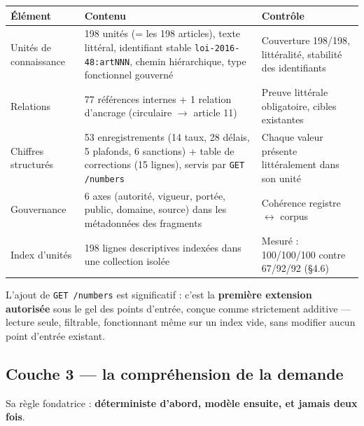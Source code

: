 \documentclass[a4paper,12pt]{report}
\begin{document}
\begin{table}[H]
\centering
\small
\begin{tabular}{p{3.4cm}p{7.4cm}p{3.7cm}}
\toprule
\textbf{Élément} & \textbf{Contenu} & \textbf{Contrôle} \\
\midrule
Unités de connaissance & 198 unités (= les 198 articles), texte littéral, identifiant stable
\texttt{loi-2016-48:artNNN}, chemin hiérarchique, type fonctionnel gouverné & Couverture 198/198,
littéralité, stabilité des identifiants \\
Relations & 77 références internes + 1 relation d'ancrage (circulaire $\rightarrow$ article 11) &
Preuve littérale obligatoire, cibles existantes \\
Chiffres structurés & 53 enregistrements (14 taux, 28 délais, 5 plafonds, 6 sanctions) + table de
corrections (15 lignes), servis par \texttt{GET /numbers} & Chaque valeur présente littéralement
dans son unité \\
Gouvernance & 6 axes (autorité, vigueur, portée, public, domaine, source) dans les métadonnées des
fragments & Cohérence registre $\leftrightarrow$ corpus \\
Index d'unités & 198 lignes descriptives indexées dans une collection isolée & Mesuré :
100/100/100 contre 67/92/92 (§4.6) \\
\bottomrule
\end{tabular}
\end{table}

L'ajout de \texttt{GET /numbers} est significatif : c'est la \textbf{première extension
autorisée} sous le gel des points d'entrée, conçue comme strictement additive — lecture seule,
filtrable, fonctionnant même sur un index vide, sans modifier aucun point d'entrée existant.

\subsection{Couche 3 — la compréhension de la demande}
Sa règle fondatrice : \textbf{déterministe d'abord, modèle ensuite, et jamais deux fois}.
\end{document}
